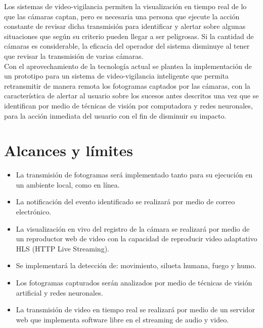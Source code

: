 Los sistemas de video-vigilancia permiten la visualización en tiempo real de lo que las cámaras captan, pero es necesaria una persona que ejecute la acción constante de revisar dicha transmisión para identificar y alertar sobre algunas situaciones que según su criterio pueden llegar a ser peligrosas. Si la cantidad de cámaras es considerable, la eficacia del operador del sistema disminuye al tener que revisar la transmisión de varias cámaras.\\

Con el aprovechamiento de la tecnología actual se plantea la implementación de un prototipo para un sistema de video-vigilancia inteligente que permita retransmitir de manera remota los fotogramas captados por las cámaras, con la característica de alertar al usuario sobre los sucesos antes descritos una vez que se identifican por medio de técnicas de visión por computadora y redes neuronales, para la acción inmediata del usuario con el fin de disminuir su impacto.

\section{Alcances y límites}
\begin{itemize}
    \item La transmisión de fotogramas será implementado tanto para su ejecución en un ambiente local, como en línea.
    \item La notificación del evento identificado se realizará por medio de correo electrónico.
    \item La visualización en vivo del registro de la cámara se realizará por medio de un reproductor web de video con la capacidad de reproducir video adaptativo HLS (HTTP Live Streaming).
    \item Se implementará la detección de: movimiento, silueta humana, fuego y humo.
    \item Los fotogramas capturados serán analizados por medio de técnicas de visión artificial y redes neuronales.
    \item La transmisión de video en tiempo real se realizará por medio de un servidor web que implementa software libre en el streaming de audio y video.
\end{itemize}